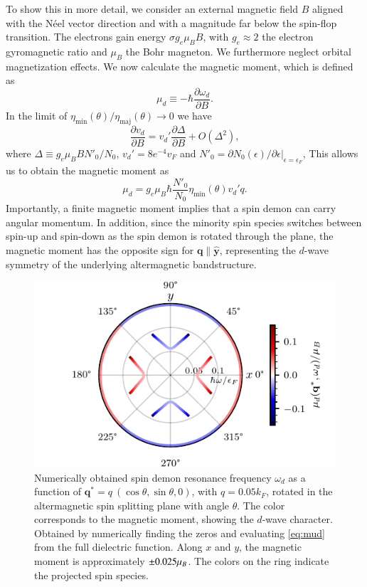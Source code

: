 \documentclass[aps,prl,reprint,twocolumns,superscriptaddress]{revtex4-2}
\newcommand{\deltaq}{\eta_{{\mathrm{min}}}(\theta)/\eta_{{\mathrm{maj}}}(\theta)}
\newcommand{\kF}{k_{F}}
\newcommand{\vs}{v_d}
\begin{document}
	To show this in more detail,  we consider an external magnetic field $B$ aligned with the N\'{e}el vector direction and with a magnitude far below the spin-flop transition. The electrons  gain energy $\sigma g_e\mu_B B$, with $g_e\approx2$ the electron gyromagnetic ratio and $\mu_B$ the Bohr magneton. We furthermore neglect orbital magnetization effects. We now calculate the magnetic moment, which is defined as
	\begin{equation}
		\mu_d \equiv -\hbar\frac{\partial\omega_d}{\partial B}. \label{eq:mud}
	\end{equation}
	In the limit of $\deltaq\rightarrow0$ we have
	\begin{equation}
		\frac{\partial \vs}{\partial B} = \vs' \frac{\partial\Delta}{\partial B} + O(\Delta^2),
	\end{equation}
	where $\Delta\equiv g_e\mu_B B N'_0 /N_0 $, $ \vs'=8e^{-4}v_F$ and $N'_0=\partial N_0(\epsilon)/\partial\epsilon|_{\epsilon=\epsilon_F}$, 
	This allows us to obtain the magnetic moment as
	\begin{equation}
		\mu_d =  g_e\mu_B\hbar \frac{N'_0}{N_0}  \eta_{\mathrm{min}}(\theta)  \vs' q. \label{eq:mup}
	\end{equation}
	Importantly, a finite magnetic moment implies that a spin demon can carry angular momentum. 
	In addition, since the minority spin species switches between spin-up and spin-down as the spin demon is rotated through the plane, the magnetic moment has the opposite sign for $\bm q \parallel \hat{\bm y}$, representing the $d$-wave symmetry of the underlying altermagnetic bandstructure. 

	\begin{figure}
		\centering
		\includegraphics[width=0.8\columnwidth]{polar-plot-sign}
		\caption{Numerically obtained spin demon resonance frequency $\omega_d$ as a function of $\bm q^*=q\ (\cos\theta, \sin\theta,0)$, with $q=0.05\kF$, rotated in the altermagnetic spin splitting plane with angle $\theta$. The color corresponds to the magnetic moment, showing the $d$-wave character. Obtained by numerically finding the zeros and evaluating \cref{eq:mud} from the full dielectric function.
			Along $x$ and $y$, the magnetic moment is approximately $\pm0.025\mu_B$. The colors on the ring indicate the projected spin species. \label{fig:magnetic-moment} }
	\end{figure}
\end{document}

